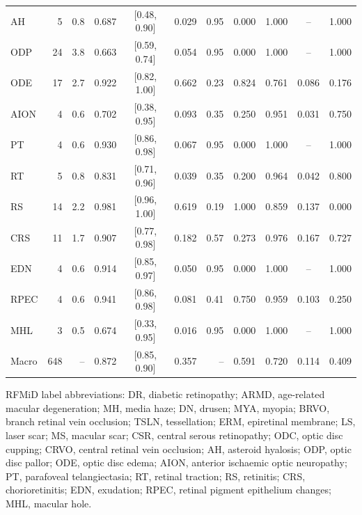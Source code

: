 \begin{table}[!t]
\begin{tabular}{lrrcccrcccc}
AH & 5 & 0.8 & 0.687 & [0.48, 0.90] & 0.029 & 0.95 & 0.000 & 1.000 & -- & 1.000 \\
ODP & 24 & 3.8 & 0.663 & [0.59, 0.74] & 0.054 & 0.95 & 0.000 & 1.000 & -- & 1.000 \\
ODE & 17 & 2.7 & 0.922 & [0.82, 1.00] & 0.662 & 0.23 & 0.824 & 0.761 & 0.086 & 0.176 \\
AION & 4 & 0.6 & 0.702 & [0.38, 0.95] & 0.093 & 0.35 & 0.250 & 0.951 & 0.031 & 0.750 \\
PT & 4 & 0.6 & 0.930 & [0.86, 0.98] & 0.067 & 0.95 & 0.000 & 1.000 & -- & 1.000 \\
RT & 5 & 0.8 & 0.831 & [0.71, 0.96] & 0.039 & 0.35 & 0.200 & 0.964 & 0.042 & 0.800 \\
RS & 14 & 2.2 & 0.981 & [0.96, 1.00] & 0.619 & 0.19 & 1.000 & 0.859 & 0.137 & 0.000 \\
CRS & 11 & 1.7 & 0.907 & [0.77, 0.98] & 0.182 & 0.57 & 0.273 & 0.976 & 0.167 & 0.727 \\
EDN & 4 & 0.6 & 0.914 & [0.85, 0.97] & 0.050 & 0.95 & 0.000 & 1.000 & -- & 1.000 \\
RPEC & 4 & 0.6 & 0.941 & [0.86, 0.98] & 0.081 & 0.41 & 0.750 & 0.959 & 0.103 & 0.250 \\
MHL & 3 & 0.5 & 0.674 & [0.33, 0.95] & 0.016 & 0.95 & 0.000 & 1.000 & -- & 1.000 \\
\midrule Macro & 648 & -- & 0.872 & [0.85, 0.90] & 0.357 & -- & 0.591 & 0.720 & 0.114 & 0.409 \\
\bottomrule
\end{tabular}

\vspace{2pt}
\parbox{\textwidth}{\scriptsize RFMiD label abbreviations: DR, diabetic retinopathy; ARMD, age-related macular degeneration; MH, media haze; DN, drusen; MYA, myopia; BRVO, branch retinal vein occlusion; TSLN, tessellation; ERM, epiretinal membrane; LS, laser scar; MS, macular scar; CSR, central serous retinopathy; ODC, optic disc cupping; CRVO, central retinal vein occlusion; AH, asteroid hyalosis; ODP, optic disc pallor; ODE, optic disc edema; AION, anterior ischaemic optic neuropathy; PT, parafoveal telangiectasia; RT, retinal traction; RS, retinitis; CRS, chorioretinitis; EDN, exudation; RPEC, retinal pigment epithelium changes; MHL, macular hole.}
\end{table}
